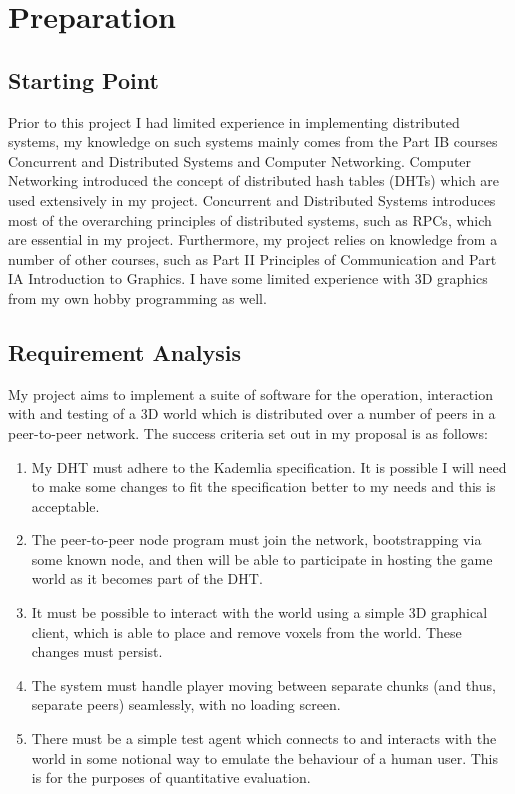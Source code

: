 \documentclass[10pt,twoside,notitlepage,a4paper]{report}
\begin{document}
	\cleardoublepage
	\chapter{Preparation}
	
	\section{Starting Point}
	Prior to this project I had limited experience in implementing distributed systems, my knowledge on such systems mainly comes from the Part IB courses Concurrent and Distributed Systems and Computer Networking. Computer Networking introduced the concept of distributed hash tables (DHTs) which are used extensively in my project. Concurrent and Distributed Systems introduces most of the overarching principles of distributed systems, such as RPCs, which are essential in my project. Furthermore, my project relies on knowledge from a number of other courses, such as Part II Principles of Communication and Part IA Introduction to Graphics. I have some limited experience with 3D graphics from my own hobby programming as well.
	
	\section{Requirement Analysis}
	\label{sec:req}
	My project aims to implement a suite of software for the operation, interaction with and testing of a 3D world which is distributed over a number of peers in a peer-to-peer network. The success criteria set out in my proposal is as follows:
	
	\begin{enumerate}
		\item My DHT must adhere to the Kademlia specification. It is possible I will need to make some changes to fit the specification better to my needs and this is acceptable.
		\item The peer-to-peer node program must join the network, bootstrapping via some known node, and then will be able to participate in hosting the game world as it becomes part of the DHT.
		\item It must be possible to interact with the world using a simple 3D graphical client, which is able to place and remove voxels from the world. These changes must persist.
		\item The system must handle player moving between separate chunks (and thus, separate peers) seamlessly, with no loading screen.
		\item There must be a simple test agent which connects to and interacts with the world in some notional way to emulate the behaviour of a human user. This is for the purposes of quantitative evaluation.
	\end{enumerate}
\end{document}
